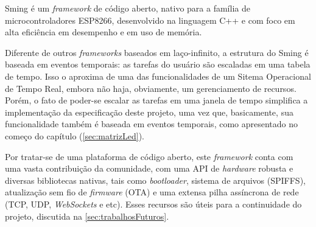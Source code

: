 Sming é um \emph{framework} de código aberto, nativo para a família de microcontroladores ESP8266, desenvolvido na linguagem {C++} e com foco em alta eficiência em desempenho e em uso de memória.

Diferente de outros \emph{frameworks} baseados em laço-infinito, a estrutura do Sming é baseada em eventos temporais: as tarefas do usuário são escaladas em uma tabela de tempo. Isso o aproxima de uma das funcionalidades de um Sitema Operacional de Tempo Real, embora não haja, obviamente, um gerenciamento de recursos. Porém, o fato de poder-se escalar as tarefas em uma janela de tempo simplifica a implementação da especificação deste projeto, uma vez que, basicamente, sua funcionalidade também é baseada em eventos temporais, como apresentado no começo do capítulo (\autoref{sec:matrizLed}).

Por tratar-se de uma plataforma de código aberto, este \emph{framework} conta com uma vasta contribuição da comunidade, com uma API de \emph{hardware} robusta e diversas bibliotecas nativas, tais como \emph{bootloader}, sistema de arquivos (SPIFFS), atualização sem fio de \emph{firmware} (OTA) e uma extensa pilha assíncrona de rede (TCP, UDP, \emph{WebSockets} e etc). Esses recursos são úteis para a continuidade do projeto, discutida na \autoref{sec:trabalhosFuturos}.
